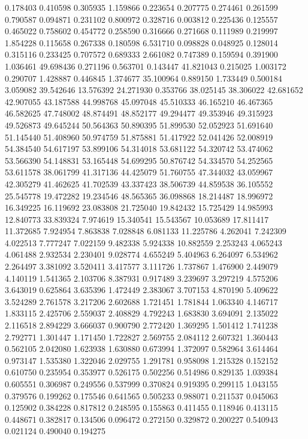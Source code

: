 0.178403
0.410598
0.305935
1.159866
0.223654
0.207775
0.274461
0.261599
0.790587
0.094871
0.231102
0.800972
0.328716
0.003812
0.225436
0.125557
0.465022
0.758602
0.454772
0.258590
0.316666
0.271668
0.111989
0.219997
1.854228
0.115658
0.267338
0.180598
6.531710
0.098828
0.048925
0.128014
0.315116
0.233425
0.707572
0.689333
2.661082
0.747389
0.159594
0.391900
1.036461
49.698436
0.271196
0.563701
0.143447
41.821043
0.215025
1.003172
0.290707
1.428887
0.446845
1.374677
35.100964
0.889150
1.733449
0.500184
3.059082
39.542646
13.576392
24.271930
0.353766
38.025145
38.306022
42.681652
42.907055
43.187588
44.998768
45.097048
45.510333
46.165210
46.467365
46.582625
47.748002
48.874491
48.852177
49.294477
49.353946
49.315923
49.526873
49.645244
50.564363
50.890395
51.899530
52.052923
51.691640
51.145440
51.408960
50.974759
51.875881
51.417922
52.041426
52.008919
54.384540
54.617197
53.899106
54.314018
53.681122
54.320742
53.474062
53.566390
54.148831
53.165448
54.699295
50.876742
54.334570
54.252565
53.611578
38.061799
41.317136
44.425079
51.760755
47.344032
43.059967
42.305279
41.462625
41.702539
43.337423
38.506739
44.859538
36.105552
25.545778
19.472282
19.234546
48.565365
36.098868
18.214487
18.996972
16.349225
16.119692
23.083808
21.725040
19.842432
15.725429
14.985993
12.840773
33.839324
7.974619
15.340541
15.543567
10.053689
17.811417
11.372685
7.924954
7.863838
7.028848
6.081133
11.225786
4.262041
7.242309
4.022513
7.777247
7.022159
9.482338
5.924338
10.882559
2.253243
4.065243
4.061488
2.932534
2.230401
9.028774
4.655249
5.404963
6.264097
6.534962
2.264497
3.381092
3.520411
3.417577
3.111726
1.737867
1.476900
2.449079
4.140119
1.541365
2.103706
8.387931
0.917489
3.239697
3.297219
4.575206
3.643019
0.625864
3.635396
1.472449
2.383067
3.707153
4.870190
5.409622
3.524289
2.761578
3.217206
2.602688
1.721451
1.781844
1.063340
4.146717
1.833115
2.425706
2.559037
2.408829
4.792243
1.683830
3.694091
2.135022
2.116518
2.894229
3.666037
0.900790
2.772420
1.369295
1.501412
1.741238
2.792771
1.301447
1.171450
1.722827
2.569755
2.084112
2.607321
1.360443
0.562105
2.042080
1.623938
1.630880
0.673994
1.372097
0.582964
3.614464
0.973147
1.535380
1.322046
2.029755
1.291781
0.958098
1.215328
0.152152
0.610750
0.235954
0.353977
0.526175
0.502256
0.514986
0.829135
1.039384
0.605551
0.306987
0.249556
0.537999
0.370824
0.919395
0.299115
1.043155
0.379576
0.199262
0.175546
0.641565
0.505233
0.988071
0.211537
0.045063
0.125902
0.384228
0.817812
0.248595
0.155863
0.411455
0.118946
0.413115
0.448671
0.382817
0.134506
0.096472
0.272150
0.329872
0.200227
0.540943
0.021124
0.490040
0.194275
